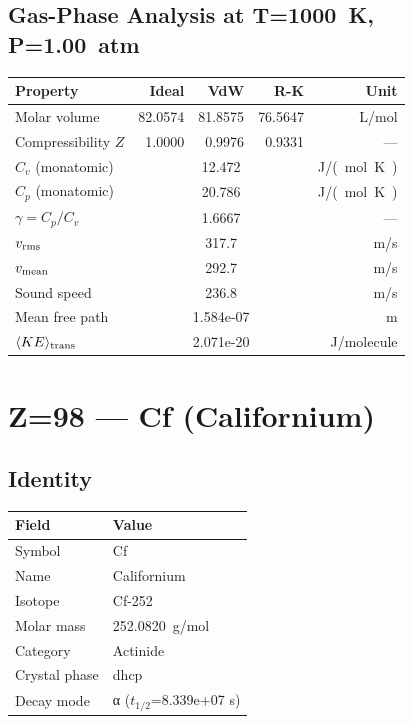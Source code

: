 \documentclass[11pt,a4paper]{article}
\begin{document}
\subsection{Gas-Phase Analysis at T=\SI{1000}{K}, P=\SI{1.00}{atm}}
\begin{tabular}{lrrrr}
  \toprule
  Property & Ideal & VdW & R-K & Unit \\
  \midrule
  Molar volume & 82.0574 & 81.8575 & 76.5647 & \si{L/mol} \\
  Compressibility $Z$ & 1.0000 & 0.9976 & 0.9331 & --- \\
  \midrule
  $C_v$ (monatomic) & \multicolumn{3}{c}{12.472} & \si{J/(mol.K)} \\
  $C_p$ (monatomic) & \multicolumn{3}{c}{20.786} & \si{J/(mol.K)} \\
  $\gamma = C_p/C_v$ & \multicolumn{3}{c}{1.6667} & --- \\
  $v_{\rm rms}$ & \multicolumn{3}{c}{317.7} & \si{m/s} \\
  $v_{\rm mean}$ & \multicolumn{3}{c}{292.7} & \si{m/s} \\
  Sound speed & \multicolumn{3}{c}{236.8} & \si{m/s} \\
  Mean free path & \multicolumn{3}{c}{1.584e-07} & \si{m} \\
  $\langle KE \rangle_{\rm trans}$ & \multicolumn{3}{c}{2.071e-20} & \si{J/molecule} \\
  \bottomrule
\end{tabular}

\newpage

\section{Z=98 --- Cf (Californium)}
\label{sec:Z98}

\subsection{Identity}
\begin{tabular}{ll}
  \toprule
  Field & Value \\
  \midrule
  Symbol & Cf \\
  Name & Californium \\
  Isotope & Cf-252 \\
  Molar mass & \SI{252.0820}{g/mol} \\
  Category & Actinide \\
  Crystal phase & dhcp \\
  Decay mode & α ($t_{1/2}$=8.339e+07 s) \\
  \bottomrule
\end{tabular}
\end{document}
